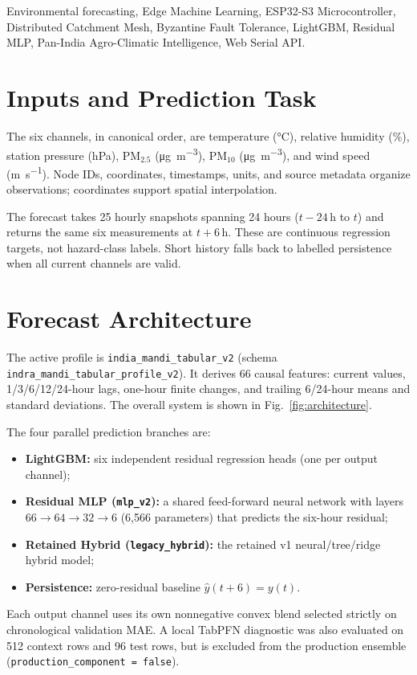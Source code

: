 \documentclass[journal,a4paper]{IEEEtran}
\begin{document}
\begin{IEEEkeywords}
Environmental forecasting, Edge Machine Learning, ESP32-S3 Microcontroller, Distributed Catchment Mesh, Byzantine Fault Tolerance, LightGBM, Residual MLP, Pan-India Agro-Climatic Intelligence, Web Serial API.
\end{IEEEkeywords}

\section{Inputs and Prediction Task}

The six channels, in canonical order, are temperature (\si{\celsius}), relative humidity (\si{\percent}), station pressure (\si{hPa}), PM$_{2.5}$ (\si{\micro\gram\per\cubic\metre}), PM$_{10}$ (\si{\micro\gram\per\cubic\metre}), and wind speed (\si{\metre\per\second}). Node IDs, coordinates, timestamps, units, and source metadata organize observations; coordinates support spatial interpolation.

The forecast takes 25 hourly snapshots spanning 24 hours ($t-24\,\text{h}$ to $t$) and returns the same six measurements at $t+6\,\text{h}$. These are continuous regression targets, not hazard-class labels. Short history falls back to labelled persistence when all current channels are valid.

\section{Forecast Architecture}

The active profile is \nolinkurl{india_mandi_tabular_v2} (schema \nolinkurl{indra_mandi_tabular_profile_v2}). It derives 66 causal features: current values, 1/3/6/12/24-hour lags, one-hour finite changes, and trailing 6/24-hour means and standard deviations. The overall system is shown in Fig.~\ref{fig:architecture}.

The four parallel prediction branches are:
\begin{itemize}
  \item \textbf{LightGBM:} six independent residual regression heads (one per output channel);
  \item \textbf{Residual MLP (\texttt{mlp\_v2}):} a shared feed-forward neural network with layers $66 \rightarrow 64 \rightarrow 32 \rightarrow 6$ (6{,}566 parameters) that predicts the six-hour residual;
  \item \textbf{Retained Hybrid (\texttt{legacy\_hybrid}):} the retained v1 neural/tree/ridge hybrid model;
  \item \textbf{Persistence:} zero-residual baseline $\hat{y}(t+6) = y(t)$.
\end{itemize}
Each output channel uses its own nonnegative convex blend selected strictly on chronological validation MAE. A local TabPFN diagnostic was also evaluated on 512 context rows and 96 test rows, but is excluded from the production ensemble (\texttt{production\_component = false}).
\end{document}
